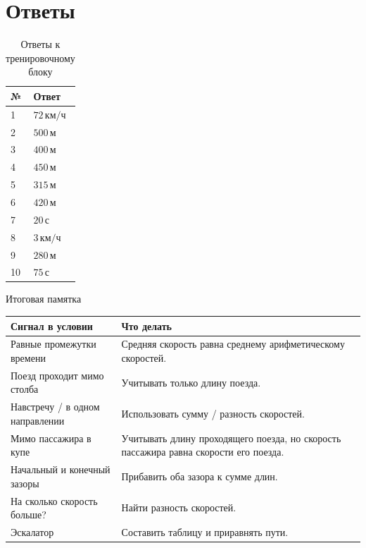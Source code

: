 \documentclass[a4paper,12pt]{article}
\newcommand{\unit}[1]{\,\text{#1}}
\begin{document}
\clearpage
\section*{Ответы}
\begin{table}[h!]
\centering
\caption{Ответы к тренировочному блоку}
\renewcommand{\arraystretch}{1.12}
\begin{tabularx}{.76\linewidth}{@{}lX@{}}
\toprule
№ & Ответ \\
\midrule
1 & $72\unit{км/ч}$\\
2 & $500\unit{м}$\\
3 & $400\unit{м}$\\
4 & $450\unit{м}$\\
5 & $315\unit{м}$\\
6 & $420\unit{м}$\\
7 & $20\unit{с}$\\
8 & $3\unit{км/ч}$\\
9 & $280\unit{м}$\\
10 & $75\unit{с}$\\
\bottomrule
\end{tabularx}
\end{table}
\vspace{4mm}
\begin{center}
{\color{darkaccent}\large Итоговая памятка}\par\smallskip
\begin{tabularx}{\linewidth}{@{}p{.37\linewidth}X@{}}
\toprule
Сигнал в условии & Что делать \\
\midrule
Равные промежутки времени & Средняя скорость равна среднему арифметическому скоростей.\\
Поезд проходит мимо столба & Учитывать только длину поезда.\\
Навстречу / в одном направлении & Использовать сумму / разность скоростей.\\
Мимо пассажира в купе & Учитывать длину проходящего поезда, но скорость пассажира равна скорости его поезда.\\
Начальный и конечный зазоры & Прибавить оба зазора к сумме длин.\\
На сколько скорость больше? & Найти разность скоростей.\\
Эскалатор & Составить таблицу и приравнять пути.\\
\bottomrule
\end{tabularx}
\end{center}
\end{document}
